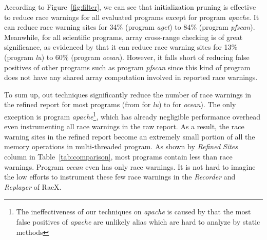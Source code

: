 \documentclass[10pt,onecolumn,letterpaper]{article}
\begin{document}
According to Figure~\ref{fig:filter}, we can see that initialization
pruning is effective to reduce race warnings for all evaluated
programs except for program \emph{apache}. It can reduce race
warning sites for 34\% (program \emph{aget}) to 84\% (program
\emph{pfscan}). Meanwhile, for all scientific programs, array
cross-range checking is of great significance, as evidenced by that
it can reduce race warning sites for 13\% (program \emph{lu}) to
60\% (program \emph{ocean}). However, it falls short of reducing
false positives of other programs such as program \emph{pfscan}
since this kind of program does not have any shared array
computation involved in reported race warnings.


To sum up, out techniques significantly reduce the number of race
warnings in the refined report for most programs (from  for
\emph{lu}) to  for \emph{ocean}). The only exception is
program \emph{apache}\footnote{The ineffectiveness of our techniques
on \emph{apache} is caused by that the most false positives of
\emph{apache} are unlikely alias which are hard to analyze by static
methods}, which has already negligible performance overhead even
instrumenting all race warnings in the raw report. As a result, the
race warning sites in the refined report become an extremely small
portion of all the memory operations in multi-threaded program. As
shown by \emph{Refined Sites} column in Table~\ref{tab:comparison},
most programs contain less than  race warnings. Program
\emph{ocean} even has only  race warnings. It is not hard to
imagine the low efforts to instrument these few race warnings in the
\emph{Recorder} and \emph{Replayer} of RacX.

\begin{table}[tb]
\caption{Reduced race warning sites for instrumentation in
RacX}\label{tab:comparison}
\end{table}
\end{document}

